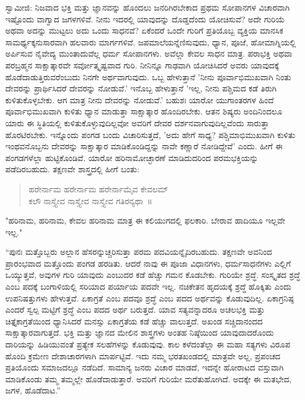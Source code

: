 ಸ್ವಾಮೀಜಿ: ನಿಜವಾದ ಭಕ್ತಿ ಮತ್ತು ಜ್ಞಾನವನ್ನು ಹೊಂದಲು ಜನರಿಗಿರಬೇಕಾದ ಪ್ರಥಮ ಸೋಪಾನಗಳ ವಿಚಾರವಾಗಿ ಇಷ್ಟೊಂದು ವಾಗ್ವಾದ ಜಗಳಗಳಿವೆ. ನೀನು ಇದರಲ್ಲಿ ಯಾವುದನ್ನು ದೊಡ್ಡದೆಂದು ಯೋಚಿಸುವೆ? ಅದೇ ಗುರಿಯೆ ಅಥವಾ ಅದನ್ನು ಮುಟ್ಟಲು ಅದು ಒಂದು ಸಾಧನವೆ? ಏಕೆಂದರೆ ಒಂದೇ ಗುರಿಗೆ ಪ್ರತಿಯೊಬ್ಬ ವ್ಯಕ್ತಿಯ ಮಾನಸಿಕ ಸಾಮರ್ಥ್ಯಕ್ಕನುಸಾರವಾಗಿ ಹಲವಾರು ಮಾರ್ಗಗಳಿವೆ. ಜಪಮಾಲೆಯನ್ನೆಣಿಸುವುದು, ಧ್ಯಾನ, ಪೂಜೆ, ಹೋಮಾಗ್ನಿಯಲ್ಲಿ ಅರ್ಪಿಸುವ ನೈವೇದ್ಯ ಮುಂತಾದುವೆಲ್ಲ ಧರ್ಮ ಸೋಪಾನಗಳು. ಅವೆಲ್ಲಾ ಕೇವಲ ಸಾಧನ ಮಾತ್ರ. ಪರಾಭಕ್ತಿ ಅಥವಾ ಪರಬ್ರಹ್ಮನ ಸಾಕ್ಷಾತ್ಕಾರವೇ ಸರ್ವೋತ್ಕೃಷ್ಟವಾದ ಗುರಿ. ನೀನಿನ್ನೂ ಗಾಢವಾಗಿ ಯೋಚಿಸಿದರೆ ಅವರು ಯಾವುದಕ್ಕೆ ಹೊಡೆದಾಡುತ್ತಿರುವರೆಂಬುದು ನಿನಗೇ ಅರ್ಥವಾಗುವುದು. ಒಬ್ಬ ಹೇಳುತ್ತಾನೆ 'ನೀನು ಪೂರ್ವಾಭಿಮುಖವಾಗಿ ನಿಂತು ದೇವರನ್ನು ಪ್ರಾರ್ಥಿಸಿದರೆ ದೇವರನ್ನು ನೋಡುವೆ.' ಇನೊಬ್ಬ ಹೇಳುತ್ತಾನೆ 'ಇಲ್ಲ, ನೀನು ಪಶ್ಚಿಮದ ಕಡೆ ತಿರುಗಿ ಕುಳಿತುಕೊಳ್ಳಬೇಕು. ಆಗ ಮಾತ್ರ ನೀನು ದೇವರನ್ನು ನೋಡುವೆ.' ಬಹುಶಃ ಯಾರೋ ಯುಗಾಂತರಗಳ ಹಿಂದೆ ಪೂರ್ವಾಭಿಮುಖವಾಗಿ ಕುಳಿತು ಧ್ಯಾನ ಮಾಡುತ್ತಾ ಸಾಕ್ಷಾತ್ಕಾರ ಹೊಂದಿರಬೇಕು. ಆತನ ಶಿಷ್ಯರು ಅಂದಿನಿಂದಲೂ ಯಾರು ಈ ಸ್ಥಿತಿಯಲ್ಲಿ ಕುಳಿತುಕೊಳ್ಳುವುದಿಲ್ಲವೋ ಅವರಿಗೆ ದೇವರ ದರ್ಶನವಾಗುವುದಿಲ್ಲವೆಂದು ಸಾರುತ್ತಾ ಹೊರಟಿರಬೇಕು. ಇನ್ನೊಂದು ಪಂಗಡ ಬಂದು ವಿಚಾರಿಸುತ್ತದೆ, 'ಅದು ಹೇಗೆ ಸಾಧ್ಯ? ಪಶ್ಚಿಮಾಭಿಮುಖವಾಗಿ ಕುಳಿತು ಇಂಥವನೊಬ್ಬನು ದೇವರನ್ನು ಸಾಕ್ಷಾತ್ಕಾರ ಮಾಡಿಕೊಂಡಿದ್ದನ್ನು ನಾವೇ ಕಣ್ಣಾರೆ ನೋಡಿದ್ದೇವೆ' ಎಂದು. ಹೀಗೆ ಈ ಪಂಗಡಗಳೆಲ್ಲಾ ಹುಟ್ಟಿಕೊಂಡಿವೆ. ಯಾರೋ ಹರಿನಾಮೋಚ್ಛಾರಣೆ ಮಾಡಿದುದರಿಂದ ಪರಮಭಕ್ತಿಯನ್ನು ಪಡೆದಿರಬಹುದು. ತಕ್ಷಣವೇ ಶಾಸ್ತ್ರದಲ್ಲಿ ಹೀಗೆ ಬಂತು:

\begin{verse}
ಹರೇರ್ನಾಮ ಹರೇರ್ನಾಮ ಹರೇರ್ನಾಮೈವ ಕೇವಲಮ್\\ಕಲೌ ನಾಸ್ತ್ಯೇವ ನಾಸ್ತ್ಯೇವ ನಾಸ್ತ್ಯೇವ ಗತಿರನ್ಯಥಾ~॥
\end{verse}

"ಹರಿನಾಮ, ಹರಿನಾಮ, ಕೇವಲ ಹರಿನಾಮ ಮಾತ್ರ ಈ ಕಲಿಯುಗದಲ್ಲಿ ಫಲಕಾರಿ. ಬೇರಾವ ಹಾದಿಯೂ ಇಲ್ಲವೇ ಇಲ್ಲ."

“ಪುನಃ ಮತ್ತೊಬ್ಬರು ಅಲ್ಲಾನ ಹೆಸರನ್ನುಚ್ಚರಿಸುತ್ತಾ ಪರಮ ಪದವಿಯನ್ನೈದಿರಬಹುದು. ತಕ್ಷಣವೇ ಅವನಿಂದ ಪ್ರಾರಂಭವಾದ ಮತ್ತೊಂದು ಪಂಗಡ ಹರಡಿತು. ಆದರೆ ನಾವು ಈ ಪೂಜಾ ವಿಧಾನಗಳು, ಧರ್ಮಸಾಧನೆಗಳು ಎಲ್ಲಿಗೆ ಒಯ್ಯುತ್ತವೆ, ಅವುಗಳ ಗುರಿ ಯಾವುದು ಎಂಬುದರ ಕಡೆ ಹೆಚ್ಚು ಗಮನ ಕೊಡಬೇಕು. ಗುರಿಯೇ ಶ್ರದ್ಧೆ. ಸಂಸ್ಕೃತದ ಶ್ರದ್ಧೆ ಎಂಬ ಪದಕ್ಕೆ ಬಂಗಾಳಿಯಲ್ಲಿ ಸರಿಯಾದ ಪರ್ಯಾಯ ಪದವೇ ಇಲ್ಲ. ನಚಿಕೇತನ ಹೃದಯಕ್ಕೆ ಶ್ರದ್ಧೆ ಹೊಕ್ಕಿತು ಎಂದು ಉಪನಿಷತ್ತುಗಳು ಹೇಳುತ್ತವೆ. ಏಕಾಗ್ರತೆ ಎಂಬ ಪದವೂ ಶ್ರದ್ಧೆ ಎಂಬ ಪದದ ಅರ್ಥವನ್ನು ಕೊಡುವುದಿಲ್ಲ. ಏಕಾಗ್ರನಿಷ್ಠ ಎಂದರೆ ಸ್ವಲ್ಪ ಮಟ್ಟಿಗೆ ಶ್ರದ್ಧೆ ಎಂಬ ಪದದ ಅರ್ಥ ಬರುತ್ತದೆ. ಯಾವ ಸತ್ಯವನ್ನಾದರೂ ಅಚಲಭಕ್ತಿ ಮತ್ತು ಚಿತ್ತೈಕಾಗ್ರತೆಯಿಂದ ಧ್ಯಾನಿಸಿದರೆ ಮನಸ್ಸು ಏಕಾಗ್ರತೆಯ ಕಡೆ ಹೆಚ್ಚು ವಾಲುತ್ತದೆ. ಅಖಂಡ ಸಚ್ಚಿದಾನಂದದ ಸಾಕ್ಷಾತ್ಕಾರವಾಗುತ್ತದೆ. ಭಕ್ತಿ ಮತ್ತು ಜ್ಞಾನದ ಮೇಲಿನ ಶಾಸ್ತ್ರಗಳು ಅಂತಹ ನಿಷ್ಠೆಯಿಂದ ಯಾವುದಾದರೊಂದು ದಾರಿಯನ್ನು ಹಿಡಿಯುವಂತೆ ಪ್ರತ್ಯೇಕ ಸಲಹೆಗಳನ್ನು ಕೊಡುವುವು. ಕಾಲ ಕಳೆದಂತೆಲ್ಲಾ ಈ ಮಹಾ ಸತ್ಯಗಳು ವಿರೂಪ ಹೊಂದಿ ಕ್ರಮೇಣ ದೇಶಾಚಾರಗಳಾಗಿ ಮಾರ್ಪಟ್ಟಿವೆ. ಇದು ನಮ್ಮ ಭರತಖಂಡದಲ್ಲಿ ಮಾತ್ರವೇ ಅಲ್ಲ, ಪ್ರಪಂಚದ ಪ್ರತಿಯೊಂದು ಸಮಾಜದಲ್ಲೂ ನಡೆದಿದೆ. ಸಾಮಾನ್ಯ ಜನರು ವಿಚಾರ ಮಾಡದೆ, ಇದನ್ನೇ ಹೋರಾಟದ ವಸ್ತುವಾಗಿ ಮಾಡಿಕೊಂಡು ತಮ್ಮ ತಮ್ಮಲ್ಲೇ ಹೊಡೆದಾಡುತ್ತಾರೆ. ಅವರಿಗೆ ಗುರಿಯೇ ಮರೆತುಹೋಗಿದೆ. ಅದಕ್ಕೇ ಈ ಮತಭೇದ, ಜಗಳ, ಹೊಡೆದಾಟ.”

